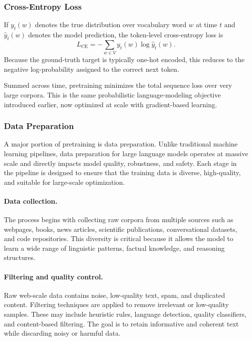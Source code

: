 \documentclass{article}
\begin{document}
\subsubsection{Cross-Entropy Loss}
If $y_t(w)$ denotes the true distribution over vocabulary word $w$ at time $t$ and $\hat{y}_t(w)$ denotes the model prediction, the token-level cross-entropy loss is
\begin{equation}
L_{\mathrm{CE}} = -\sum_{w\in V} y_t(w)\log \hat{y}_t(w).
\end{equation}
Because the ground-truth target is typically one-hot encoded, this reduces to the negative log-probability assigned to the correct next token.

Summed across time, pretraining minimizes the total sequence loss over very large corpora. This is the same probabilistic language-modeling objective introduced earlier, now optimized at scale with gradient-based learning.

\subsubsection{Data Preparation}

A major portion of pretraining is data preparation. Unlike traditional machine learning pipelines, data preparation for large language models operates at massive scale and directly impacts model quality, robustness, and safety. Each stage in the pipeline is designed to ensure that the training data is diverse, high-quality, and suitable for large-scale optimization.

\paragraph{Data collection.}
The process begins with collecting raw corpora from multiple sources such as webpages, books, news articles, scientific publications, conversational datasets, and code repositories. This diversity is critical because it allows the model to learn a wide range of linguistic patterns, factual knowledge, and reasoning structures.

\paragraph{Filtering and quality control.}
Raw web-scale data contains noise, low-quality text, spam, and duplicated content. Filtering techniques are applied to remove irrelevant or low-quality samples. These may include heuristic rules, language detection, quality classifiers, and content-based filtering. The goal is to retain informative and coherent text while discarding noisy or harmful data.
\end{document}
